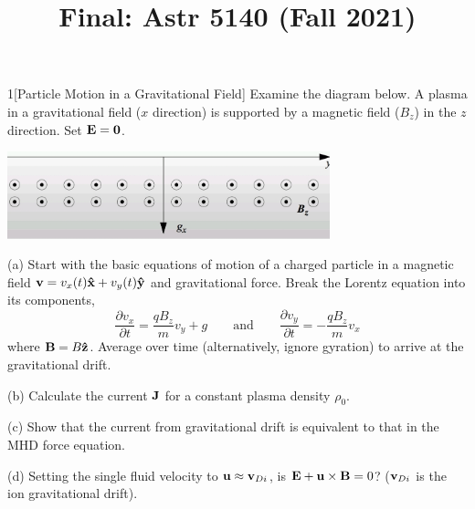 \documentclass[12pt]{article}
\title{Final: Astr 5140 (Fall 2021)}
\begin{document}
\maketitle
\begin{problem}{1}[Particle Motion in a Gravitational Field]
Examine the diagram below. A plasma in a gravitational field ($x$ direction) is
supported by a magnetic field ($B_z$) in the $z$ direction. Set $\vb{E}=\vb{0}$.

\begin{center}
    \includegraphics[width=0.7\textwidth]{final_p1.jpg}
\end{center}

(a) Start with the basic equations of motion of a charged particle in a magnetic
field $\vb{v}=v_x(t)\vb{\hat{x}}+v_y(t)\vb{\hat{y}}$ and gravitational force. Break the
Lorentz equation into its components,
\begin{equation}
    \frac{\partial v_x}{\partial t}=\frac{qB_z}{m}v_y+g
    \qquad\text{and}\qquad
    \frac{\partial v_y}{\partial t}=-\frac{qB_z}{m}v_x
\end{equation}
where $\vb{B}=B\vb{\hat{z}}$. Average over time (alternatively, ignore gyration) to
arrive at the gravitational drift.

(b) Calculate the current $\vb{J}$ for a constant plasma density $\rho_0$.

(c) Show that the current from gravitational drift is equivalent to that in the
MHD force equation.

(d) Setting the single fluid velocity to $\vb{u}\approx \vb{v}_{Di}$, is
$\vb{E}+\vb{u}\times\vb{B}=0$? ($\vb{v}_{Di}$ is the ion gravitational drift).


\end{problem}
\end{document}
